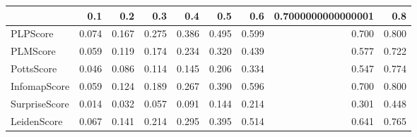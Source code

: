 \begin{tabular}{lrrrrrrrr}
\toprule
{} &   0.1 &   0.2 &   0.3 &   0.4 &   0.5 &   0.6 & 0.7000000000000001 &   0.8 \\
\midrule
PLPScore      & 0.074 & 0.167 & 0.275 & 0.386 & 0.495 & 0.599 &              0.700 & 0.800 \\
PLMScore      & 0.059 & 0.119 & 0.174 & 0.234 & 0.320 & 0.439 &              0.577 & 0.722 \\
PottsScore    & 0.046 & 0.086 & 0.114 & 0.145 & 0.206 & 0.334 &              0.547 & 0.774 \\
InfomapScore  & 0.059 & 0.124 & 0.189 & 0.267 & 0.390 & 0.596 &              0.700 & 0.800 \\
SurpriseScore & 0.014 & 0.032 & 0.057 & 0.091 & 0.144 & 0.214 &              0.301 & 0.448 \\
LeidenScore   & 0.067 & 0.141 & 0.214 & 0.295 & 0.395 & 0.514 &              0.641 & 0.765 \\
\bottomrule
\end{tabular}
